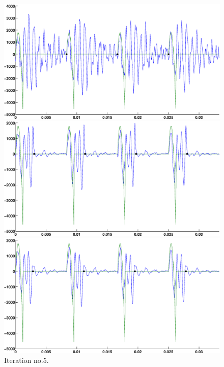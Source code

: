 \documentclass[12pt,a4]{article}
\begin{document}
\begin{figure}[H]
\begin{center}
 \caption*{In figures \ref{fig:app3-beginning} to \ref{fig:app3-end} the signal frequency is 123 Hz. The approximation algorithm acquired $Q_{guess} = 0.341$ at the end of the iterations, while the actual parameter $Q = 0.15$, relative error of the reconstruction $\approx$ 98.4\%, $\alpha \approx 8.3$. }
 \includegraphics[scale=.35]{img/Approx_iter_wRef-v3-1.eps}
 \caption{Iteration no.1}\label{fig:app3-beginning}
 \includegraphics[scale=.35]{img/Approx_iter_wRef-v3-2.eps}
 \caption{Iteration no.2}
 \includegraphics[scale=.35]{img/Approx_iter_wRef-v3-3.eps}
 \caption{Iteration no.5.}
\end{center}
\end{figure}
\end{document}
